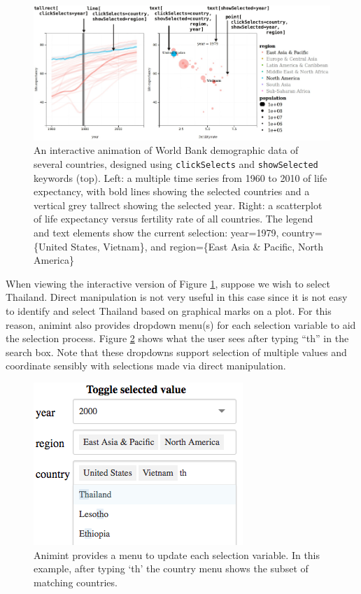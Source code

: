 \documentclass[12pt,]{article}
\theoremstyle{definition}
\theoremstyle{definition}
\theoremstyle{remark}
\begin{document}
\begin{figure}
\centering
\includegraphics{images/figure-1.pdf}
\caption{\label{fig:worldbank}An interactive animation of World Bank
demographic data of several countries, designed using
\texttt{clickSelects} and \texttt{showSelected} keywords (top). Left: a
multiple time series from 1960 to 2010 of life expectancy, with bold
lines showing the selected countries and a vertical grey tallrect
showing the selected year. Right: a scatterplot of life expectancy
versus fertility rate of all countries. The legend and text elements
show the current selection: year=1979, country= \{United States,
Vietnam\}, and region=\{East Asia \& Pacific, North America\}}
\end{figure}

When viewing the interactive version of Figure \ref{fig:worldbank},
suppose we wish to select Thailand. Direct manipulation is not very
useful in this case since it is not easy to identify and select Thailand
based on graphical marks on a plot. For this reason, animint also
provides dropdown menu(s) for each selection variable to aid the
selection process. Figure \ref{fig:widgets} shows what the user sees
after typing ``th'' in the search box. Note that these dropdowns support
selection of multiple values and coordinate sensibly with selections
made via direct manipulation.

\begin{figure}
\centering
\includegraphics{images/dropdown}
\caption{\label{fig:widgets}Animint provides a menu to update each selection
variable. In this example, after typing `th' the country menu shows the
subset of matching countries.}
\end{figure}
\end{document}
